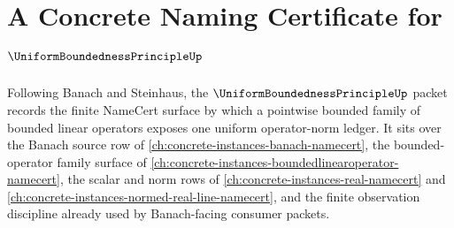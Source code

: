 \chapter{A Concrete Naming Certificate for $\UniformBoundednessPrincipleUp$}
\label{ch:concrete-instances-uniform-boundedness-principle-namecert}

Following Banach and Steinhaus, the $\UniformBoundednessPrincipleUp$ packet records the finite NameCert surface by which a pointwise bounded family of bounded linear operators exposes one uniform operator-norm ledger. It sits over the Banach source row of \autoref{ch:concrete-instances-banach-namecert}, the bounded-operator family surface of \autoref{ch:concrete-instances-boundedlinearoperator-namecert}, the scalar and norm rows of \autoref{ch:concrete-instances-real-namecert} and \autoref{ch:concrete-instances-normed-real-line-namecert}, and the finite observation discipline already used by Banach-facing consumer packets.

